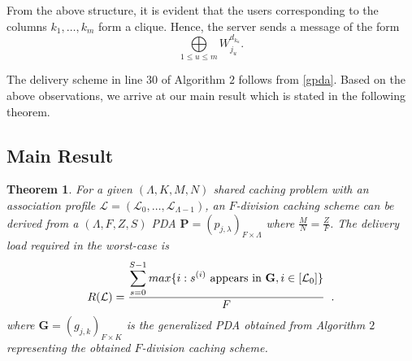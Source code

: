 \documentclass[conference,a4paper,10pt]{IEEEtran}
\newtheorem{thm}{Theorem}
\begin{document}
From the above structure, it is evident that the users corresponding to the columns $k_1, \ldots, k_m$ form a clique. Hence, the server sends a message of the form
\begin{equation}
\underset{1 \leq u \leq m}{\bigoplus} W^{d_{k_u}}_{j_u}.
\label{gpda}
\end{equation}

The delivery scheme in line $30$ of Algorithm $2$ follows from \eqref{gpda}. 
Based on the above observations, we arrive at our main result which is stated in the following theorem.

\subsection{Main Result}
\begin{thm}
	\label{new}
	For a given $(\Lambda, K, M, N)$ shared caching problem with an association profile $\mathcal{L}=(\mathcal{L}_0,\ldots,\mathcal{L}_{\Lambda-1})$, an $F$-division caching scheme can be derived from a $(\Lambda, F,Z,S)$ PDA $\mathbf{P}=(p_{j,\lambda})_{F \times \Lambda}$ where $\frac{M}{N}=\frac{Z}{F}$. The delivery load required in the worst-case is 
	\begin{equation}
	R(\mathcal{L}) = \frac{\displaystyle\sum_{s=0}^{S-1} max\{i : s^{(i)} \textrm{ appears in } \mathbf{G}, i \in [\mathcal{L}_0]\}}{F} \textrm {\hspace{0.2cm}.}
	\label{thm4}
	\end{equation}
	where	$\mathbf{G}=(g_{j,k})_{F\times K}$ is the generalized PDA obtained from Algorithm $2$ representing the obtained $F$-division  caching scheme.
\end{thm}
\end{document}
